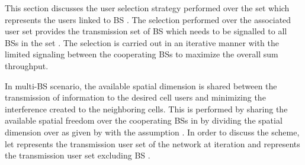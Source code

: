 
This section discusses the user selection strategy performed over the set  which represents the users linked to BS . The selection performed over the associated user set  provides the transmission set  of BS  which needs to be signalled to all BSs in the set . The selection is carried out in an iterative manner with the limited signaling between the cooperating BSs to maximize the overall sum throughput.

In multi-BS scenario, the available spatial dimension  is shared between the transmission of information to the desired cell users and minimizing the interference created to the neighboring cells. This is performed by sharing the available spatial freedom  over the cooperating BSs in  by dividing the spatial dimension over  as given by  with the assumption . In order to discuss the scheme, let  represents the transmission user set of the network at  iteration and 
 represents the transmission user set excluding BS .

